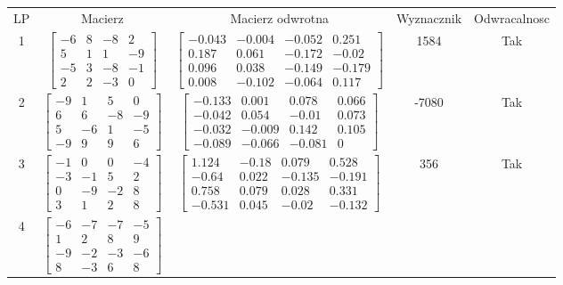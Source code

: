 \documentclass[a4paper,12pt]{article}
\begin{document}
\bgroup {} \vspace{0.2in} \begin{tabular}{c c c c c}
LP & Macierz & Macierz odwrotna & Wyznacznik & Odwracalnosc\\
1
&
$\begin{bmatrix} -6 & 8 & -8 & 2 \\ 5 & 1 & 1 & -9 \\ -5 & 3 & -8 & -1 \\ 2 & 2 & -3 & 0 \end{bmatrix}$
&
$\begin{bmatrix} -0.043 & -0.004 & -0.052 & 0.251 \\ 0.187 & 0.061 & -0.172 & -0.02 \\ 0.096 & 0.038 & -0.149 & -0.179 \\ 0.008 & -0.102 & -0.064 & 0.117 \end{bmatrix}$
&
1584
&
Tak
\\
2
&
$\begin{bmatrix} -9 & 1 & 5 & 0 \\ 6 & 6 & -8 & -9 \\ 5 & -6 & 1 & -5 \\ -9 & 9 & 9 & 6 \end{bmatrix}$
&
$\begin{bmatrix} -0.133 & 0.001 & 0.078 & 0.066 \\ -0.042 & 0.054 & -0.01 & 0.073 \\ -0.032 & -0.009 & 0.142 & 0.105 \\ -0.089 & -0.066 & -0.081 & 0 \end{bmatrix}$
&
-7080
&
Tak
\\
3
&
$\begin{bmatrix} -1 & 0 & 0 & -4 \\ -3 & -1 & 5 & 2 \\ 0 & -9 & -2 & 8 \\ 3 & 1 & 2 & 8 \end{bmatrix}$
&
$\begin{bmatrix} 1.124 & -0.18 & 0.079 & 0.528 \\ -0.64 & 0.022 & -0.135 & -0.191 \\ 0.758 & 0.079 & 0.028 & 0.331 \\ -0.531 & 0.045 & -0.02 & -0.132 \end{bmatrix}$
&
356
&
Tak
\\
4
&
$\begin{bmatrix} -6 & -7 & -7 & -5 \\ 1 & 2 & 8 & 9 \\ -9 & -2 & -3 & -6 \\ 8 & -3 & 6 & 8 \end{bmatrix}$

\end{tabular}
\end{document}
